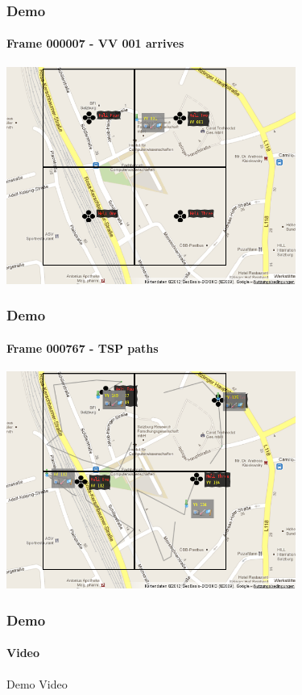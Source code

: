 \documentclass{beamer}
\begin{document}
\begin{frame}\frametitle{Demo}\framesubtitle{Frame 000007 - VV 001 arrives}
        \begin{center}
                {\includegraphics[width=9.5cm]{out-00007-mod.png}}
        \end{center}
\end{frame}


\begin{frame}\frametitle{Demo}\framesubtitle{Frame 000767 - TSP paths}
        \begin{center}
                {\includegraphics[width=9.5cm]{out-00767-mod.png}}
        \end{center}
\end{frame}


\begin{frame}\frametitle{Demo}\framesubtitle{Video}
Demo Video

\end{frame}
\end{document}
